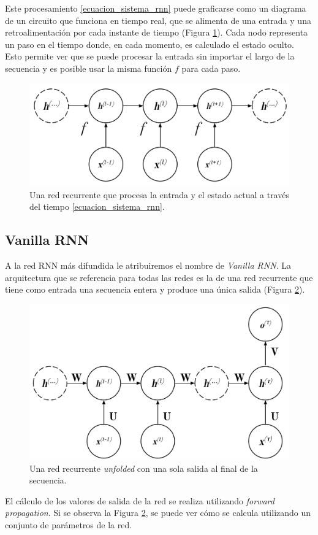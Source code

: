 \documentclass[spanish]{article}
\theoremstyle{definition}
\theoremstyle{remark}
\numberwithin{equation}{section}
\numberwithin{equation}{section} %
\begin{document}
Este procesamiento \eqref{ecuacion_sistema_rnn} puede graficarse como un diagrama de un circuito que funciona en tiempo real, que se alimenta de una entrada y una retroalimentación por cada instante de tiempo (Figura \ref{fig:diagRNN}). Cada nodo representa un paso en el tiempo donde, en cada momento, es calculado el estado oculto. Esto permite ver que se puede procesar la entrada sin importar el largo de la secuencia y es posible usar la misma función $f$ para cada paso.     \par
\begin{figure}[H]
 \centering
 \includegraphics[width=15cm]{img/RNN_Schema.png}
\caption[Diagrama RNN]{\footnotesize{ Una red recurrente que procesa la entrada  y el estado actual  a través del tiempo \eqref{ecuacion_sistema_rnn}.}}
\label{fig:diagRNN}
\end{figure}
\subsection{Vanilla RNN}
\label{ssec:vanillaRNN}

A la red RNN más difundida le atribuiremos el nombre de \textit{Vanilla RNN}. La arquitectura que se referencia para todas las redes es la de una red recurrente que tiene como entrada una secuencia entera y produce una única salida (Figura \ref{fig:RNN_single_output}).

\begin{figure}[H]
 \centering
 \includegraphics[width=12cm]{img/RNN_Schema_Single_Output.png}
\caption[Diagrama RNN con una sola salida]{\footnotesize{ Una red recurrente \cite{goodfellow2016deep} \textit{unfolded} con una sola salida al final de la secuencia.  }}
\label{fig:RNN_single_output}
\end{figure}
El cálculo de los valores de salida  de la red se realiza utilizando  \textit{forward propagation}. Si se observa la Figura \ref{fig:RNN_single_output}, se puede ver cómo se calcula utilizando un conjunto de parámetros de la red. 
\end{document}
